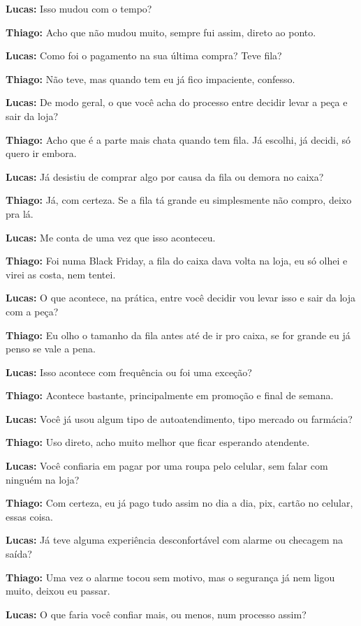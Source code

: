 \textbf{Lucas:} Isso mudou com o tempo?

\textbf{Thiago:} Acho que não mudou muito, sempre fui assim, direto ao ponto.

\textbf{Lucas:} Como foi o pagamento na sua última compra? Teve fila?

\textbf{Thiago:} Não teve, mas quando tem eu já fico impaciente, confesso.

\textbf{Lucas:} De modo geral, o que você acha do processo entre decidir levar a peça e sair da loja?

\textbf{Thiago:} Acho que é a parte mais chata quando tem fila. Já escolhi, já decidi, só quero ir embora.

\textbf{Lucas:} Já desistiu de comprar algo por causa da fila ou demora no caixa?

\textbf{Thiago:} Já, com certeza. Se a fila tá grande eu simplesmente não compro, deixo pra lá.

\textbf{Lucas:} Me conta de uma vez que isso aconteceu.

\textbf{Thiago:} Foi numa Black Friday, a fila do caixa dava volta na loja, eu só olhei e virei as costa, nem tentei.

\textbf{Lucas:} O que acontece, na prática, entre você decidir vou levar isso e sair da loja com a peça?

\textbf{Thiago:} Eu olho o tamanho da fila antes até de ir pro caixa, se for grande eu já penso se vale a pena.

\textbf{Lucas:} Isso acontece com frequência ou foi uma exceção?

\textbf{Thiago:} Acontece bastante, principalmente em promoção e final de semana.

\textbf{Lucas:} Você já usou algum tipo de autoatendimento, tipo mercado ou farmácia?

\textbf{Thiago:} Uso direto, acho muito melhor que ficar esperando atendente.

\textbf{Lucas:} Você confiaria em pagar por uma roupa pelo celular, sem falar com ninguém na loja?

\textbf{Thiago:} Com certeza, eu já pago tudo assim no dia a dia, pix, cartão no celular, essas coisa.

\textbf{Lucas:} Já teve alguma experiência desconfortável com alarme ou checagem na saída?

\textbf{Thiago:} Uma vez o alarme tocou sem motivo, mas o segurança já nem ligou muito, deixou eu passar.

\textbf{Lucas:} O que faria você confiar mais, ou menos, num processo assim?


